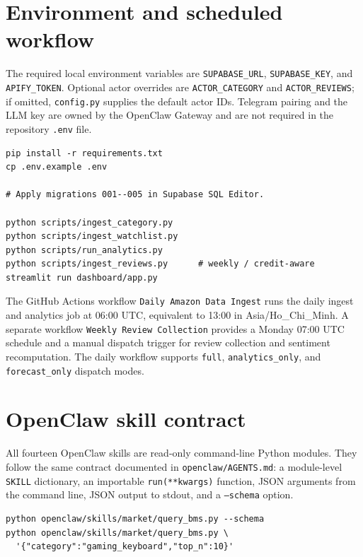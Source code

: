\section{Environment and scheduled workflow}

The required local environment variables are \texttt{SUPABASE\_URL}, \texttt{SUPABASE\_KEY}, and \texttt{APIFY\_TOKEN}. Optional actor overrides are \texttt{ACTOR\_CATEGORY} and \texttt{ACTOR\_REVIEWS}; if omitted, \texttt{config.py} supplies the default actor IDs. Telegram pairing and the LLM key are owned by the OpenClaw Gateway and are not required in the repository \texttt{.env} file.

\begin{lstlisting}
pip install -r requirements.txt
cp .env.example .env

# Apply migrations 001--005 in Supabase SQL Editor.

python scripts/ingest_category.py
python scripts/ingest_watchlist.py
python scripts/run_analytics.py
python scripts/ingest_reviews.py      # weekly / credit-aware
streamlit run dashboard/app.py
\end{lstlisting}

The GitHub Actions workflow \texttt{Daily Amazon Data Ingest} runs the daily ingest and analytics job at 06:00 UTC, equivalent to 13:00 in Asia/Ho\_Chi\_Minh. A separate workflow \texttt{Weekly Review Collection} provides a Monday 07:00 UTC schedule and a manual dispatch trigger for review collection and sentiment recomputation. The daily workflow supports \texttt{full}, \texttt{analytics\_only}, and \texttt{forecast\_only} dispatch modes.

\section{OpenClaw skill contract}

All fourteen OpenClaw skills are read-only command-line Python modules. They follow the same contract documented in \texttt{openclaw/AGENTS.md}: a module-level \texttt{SKILL} dictionary, an importable \texttt{run(**kwargs)} function, JSON arguments from the command line, JSON output to stdout, and a \texttt{--schema} option.

\begin{lstlisting}
python openclaw/skills/market/query_bms.py --schema
python openclaw/skills/market/query_bms.py \
  '{"category":"gaming_keyboard","top_n":10}'
\end{lstlisting}

